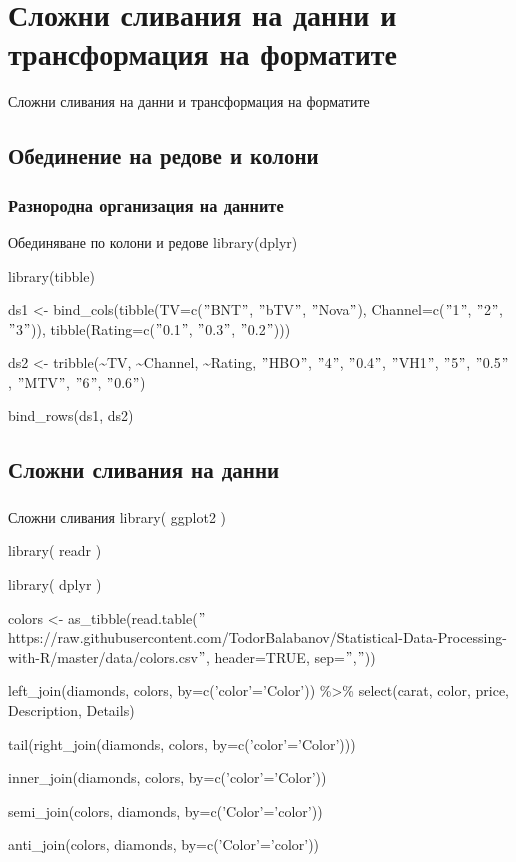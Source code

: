 \documentclass{beamer}
\begin{document}
\section{Сложни сливания на данни и трансформация на форматите}

\begin{frame}
\center \huge{Сложни сливания на данни и трансформация на форматите}
\end{frame}

\subsection{Обединение на редове и колони}

\begin{frame}
\frametitle{Разнородна организация на данните}
\begin{block}{Обединяване по колони и редове}
library(dplyr)

library(tibble)

ds1 <- bind\_cols(tibble(TV=c($"$BNT$"$, $"$bTV$"$, $"$Nova$"$), Channel=c($"$1$"$, $"$2$"$, $"$3$"$)), tibble(Rating=c($"$0.1$"$, $"$0.3$"$, $"$0.2$"$)))

ds2 <- tribble(\textasciitilde TV, \textasciitilde Channel, \textasciitilde Rating, $"$HBO$"$, $"$4$"$, $"$0.4$"$, $"$VH1$"$, $"$5$"$, $"$0.5$"$, $"$MTV$"$, $"$6$"$, $"$0.6$"$)

bind\_rows(ds1, ds2)
\end{block}
\end{frame}

\subsection{Сложни сливания на данни}

\begin{frame}
\frametitle{}
\begin{block}{Сложни сливания}
library( ggplot2 )

library( readr )

library( dplyr )

colors <- as\_tibble(read.table($"$https://raw.githubusercontent.com/TodorBalabanov/Statistical-Data-Processing-with-R/master/data/colors.csv$"$, header=TRUE, sep=$"$,$"$))

left\_join(diamonds, colors, by=c('color'='Color')) \%>\% select(carat, color, price, Description, Details)

tail(right\_join(diamonds, colors, by=c('color'='Color')))

inner\_join(diamonds, colors, by=c('color'='Color'))

semi\_join(colors, diamonds, by=c('Color'='color'))

anti\_join(colors, diamonds, by=c('Color'='color'))
\end{block}
\end{frame}
\end{document}

